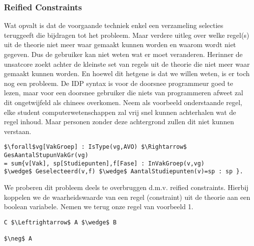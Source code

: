 \subsubsection{Reified Constraints}
Wat opvalt is dat de voorgaande techniek enkel een verzameling selecties teruggeeft die bijdragen tot het probleem. Maar verdere uitleg over welke regel(s) uit de theorie niet meer waar gemaakt kunnen worden en waarom wordt niet gegeven. Dus de gebruiker kan niet weten wat er moet veranderen. 
Herinner de unsatcore zoekt achter de kleinste set van regels uit de theorie die niet meer waar gemaakt kunnen worden. En hoewel dit hetgene is dat we willen weten, is er toch nog een probleem. 
De IDP syntax is voor de doorsnee programmeur goed te lezen, maar voor een doorsnee gebruiker die niets van programmeren afweet zal dit ongetwijfeld als chinees overkomen. Neem als voorbeeld onderstaande regel, elke student computerwetenschappen zal vrij snel kunnen achterhalen wat de regel inhoud. Maar personen zonder deze achtergrond zullen dit niet kunnen verstaan.
\begin{lstlisting}[mathescape, caption=IDP Rule Example, frame=topline/bottomline]
$\forall$vg[VakGroep] : IsType(vg,AVO) $\Rightarrow$ GesAantalStupunVakGr(vg) 
= sum{v[Vak], sp[Studiepunten],f[Fase] : InVakGroep(v,vg) 
$\wedge$ Geselecteerd(v,f) $\wedge$ AantalStudiepunten(v)=sp : sp }.
\end{lstlisting}
We proberen dit probleem deels te overbruggen d.m.v. reified constraints. Hierbij koppelen we de waarheidswaarde van een regel (constraint) uit de theorie aan een boolean variabele. Nemen we terug onze regel van voorbeeld 1.
\begin{lstlisting}[mathescape]
C $\Leftrightarrow$ A $\wedge$ B

$\neg$ A
\end{lstlisting}


